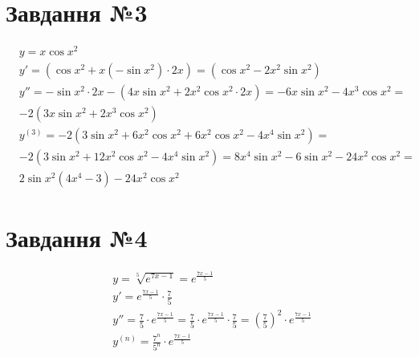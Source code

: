 \documentclass{report}
\begin{document}
\section{Завдання №3}
\begin{equation}\label{eq3}\begin{split}
	& y = x\cos x^{2}\\
	& y' = (\cos x^{2} + x(-\sin x^{2})\cdot2x) = (\cos x^{2} - 2x^{2}\sin x^{2})\\
	& y'' = -\sin x^{2} \cdot 2x - (4x\sin x^{2} + 2x^{2}\cos x^{2} \cdot 2x) = -6x\sin x^{2} - 4x^{3}\cos x^{2} =\\
	& -2(3x\sin x^{2} + 2x^{3}\cos x^{2}) \\
	& y^{(3)} = -2(3\sin x^{2} + 6x^{2}\cos x^{2} + 6x^{2} \cos x^{2} - 4x^{4} \sin x^{2}) =\\
	& -2(3\sin x^{2} + 12x^{2}\cos x^{2} - 4x^{4} \sin x^{2}) = 8x^{4}\sin x^{2} - 6\sin x^{2} - 24x^{2} \cos x^{2} =\\
	& 2\sin x^{2} (4x^{4} - 3) - 24x^{2}\cos x^{2}
\end{split}\end{equation}

\section{Завдання №4}
\begin{equation}\label{eq4}\begin{split}
	& y = \sqrt[5]{e^{7x - 1}} = e^{\frac{7x - 1}{5}}\\
	& y' = e^{\frac{7x - 1}{5}} \cdot \frac{7}{5}\\
	& y'' = \frac{7}{5} \cdot e^{\frac{7x - 1}{5}} = \frac{7}{5} \cdot e^{\frac{7x - 1}{5}} \cdot \frac{7}{5} = \left(\frac{7}{5}\right)^{2} \cdot e^{\frac{7x - 1}{5}}\\
	& y^{(n)} = \frac{7^{n}}{5^{n}} \cdot e^{\frac{7x - 1}{5}}
\end{split}\end{equation}
\end{document}
